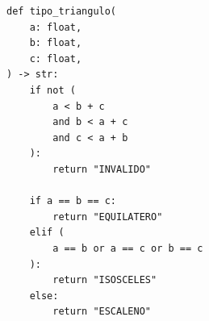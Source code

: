 \ifmostrarGabarito
\begin{verbatim}
def tipo_triangulo(
    a: float,
    b: float,
    c: float,
) -> str:
    if not (
        a < b + c
        and b < a + c
        and c < a + b
    ):
        return "INVALIDO"
    
    if a == b == c:
        return "EQUILATERO"
    elif (
        a == b or a == c or b == c
    ):
        return "ISOSCELES"
    else:
        return "ESCALENO" 
\end{verbatim}

\fi
